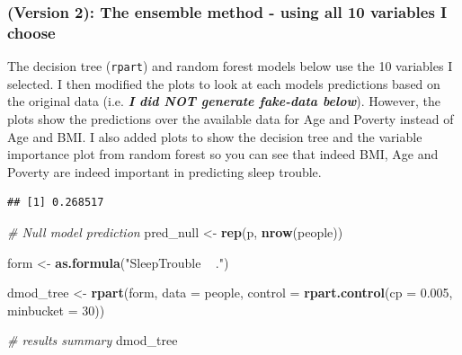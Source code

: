 \documentclass[]{article}
\newenvironment{Shaded}{\begin{snugshade}}{\end{snugshade}}
\newcommand{\KeywordTok}[1]{\textcolor[rgb]{0.13,0.29,0.53}{\textbf{{#1}}}}
\newcommand{\DataTypeTok}[1]{\textcolor[rgb]{0.13,0.29,0.53}{{#1}}}
\newcommand{\DecValTok}[1]{\textcolor[rgb]{0.00,0.00,0.81}{{#1}}}
\newcommand{\FloatTok}[1]{\textcolor[rgb]{0.00,0.00,0.81}{{#1}}}
\newcommand{\StringTok}[1]{\textcolor[rgb]{0.31,0.60,0.02}{{#1}}}
\newcommand{\CommentTok}[1]{\textcolor[rgb]{0.56,0.35,0.01}{\textit{{#1}}}}
\newcommand{\NormalTok}[1]{{#1}}
\begin{document}
\subsubsection{(Version 2): The ensemble method - using all 10 variables
I
choose}\label{version-2-the-ensemble-method---using-all-10-variables-i-choose}

The decision tree (\texttt{rpart}) and random forest models below use
the 10 variables I selected. I then modified the plots to look at each
models predictions based on the original data (i.e. \emph{\textbf{I did
NOT generate fake-data below}}). However, the plots show the predictions
over the available data for Age and Poverty instead of Age and BMI. I
also added plots to show the decision tree and the variable importance
plot from random forest so you can see that indeed BMI, Age and Poverty
are indeed important in predicting sleep trouble.

\begin{Shaded}
\end{Shaded}

\begin{verbatim}
## [1] 0.268517
\end{verbatim}

\begin{Shaded}
\begin{Highlighting}[]
\CommentTok{# Null model prediction}
\NormalTok{pred_null <-}\StringTok{ }\KeywordTok{rep}\NormalTok{(p, }\KeywordTok{nrow}\NormalTok{(people))}

\NormalTok{form <-}\StringTok{ }\KeywordTok{as.formula}\NormalTok{(}\StringTok{"SleepTrouble ~ ."}\NormalTok{)}

\NormalTok{dmod_tree <-}\StringTok{ }\KeywordTok{rpart}\NormalTok{(form, }\DataTypeTok{data =} \NormalTok{people, }
                   \DataTypeTok{control =} \KeywordTok{rpart.control}\NormalTok{(}\DataTypeTok{cp =} \FloatTok{0.005}\NormalTok{, }\DataTypeTok{minbucket =} \DecValTok{30}\NormalTok{))}

\CommentTok{# results summary}
\NormalTok{dmod_tree}
\end{Highlighting}
\end{Shaded}
\end{document}
